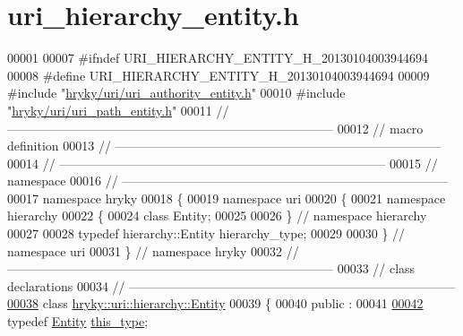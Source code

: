 \hypertarget{uri__hierarchy__entity_8h_source}{\section{uri\-\_\-hierarchy\-\_\-entity.\-h}
}

\begin{DoxyCode}
00001 
00007 \textcolor{preprocessor}{#ifndef URI\_HIERARCHY\_ENTITY\_H\_20130104003944694}
00008 \textcolor{preprocessor}{}\textcolor{preprocessor}{#define URI\_HIERARCHY\_ENTITY\_H\_20130104003944694}
00009 \textcolor{preprocessor}{}\textcolor{preprocessor}{#include "\hyperlink{uri__authority__entity_8h}{hryky/uri/uri_authority_entity.h}"}
00010 \textcolor{preprocessor}{#include "\hyperlink{uri__path__entity_8h}{hryky/uri/uri_path_entity.h}"}
00011 \textcolor{comment}{//
      ------------------------------------------------------------------------------}
00012 \textcolor{comment}{// macro definition}
00013 \textcolor{comment}{//
      ------------------------------------------------------------------------------}
00014 \textcolor{comment}{//
      ------------------------------------------------------------------------------}
00015 \textcolor{comment}{// namespace}
00016 \textcolor{comment}{//
      ------------------------------------------------------------------------------}
00017 \textcolor{keyword}{namespace }hryky
00018 \{
00019 \textcolor{keyword}{namespace }uri
00020 \{
00021 \textcolor{keyword}{namespace }hierarchy
00022 \{
00024     \textcolor{keyword}{class }Entity;
00025 
00026 \} \textcolor{comment}{// namespace hierarchy}
00027 
00028 \textcolor{keyword}{typedef} hierarchy::Entity hierarchy\_type;
00029 
00030 \} \textcolor{comment}{// namespace uri}
00031 \} \textcolor{comment}{// namespace hryky}
00032 \textcolor{comment}{//
      ------------------------------------------------------------------------------}
00033 \textcolor{comment}{// class declarations}
00034 \textcolor{comment}{//
      ------------------------------------------------------------------------------}
\hypertarget{uri__hierarchy__entity_8h_source_l00038}{}\hyperlink{classhryky_1_1uri_1_1hierarchy_1_1_entity}{00038} \textcolor{comment}{}\textcolor{keyword}{class }\hyperlink{classhryky_1_1uri_1_1hierarchy_1_1_entity}{hryky::uri::hierarchy::Entity}
00039 \{
00040 \textcolor{keyword}{public} :
00041 
\hypertarget{uri__hierarchy__entity_8h_source_l00042}{}\hyperlink{classhryky_1_1uri_1_1hierarchy_1_1_entity_a75ba54ddfefb82538bddab2df6946e4b}{00042}     \textcolor{keyword}{typedef} \hyperlink{classhryky_1_1uri_1_1hierarchy_1_1_entity}{Entity} \hyperlink{classhryky_1_1uri_1_1hierarchy_1_1_entity_a75ba54ddfefb82538bddab2df6946e4b}{this_type};

\end{DoxyCode}
